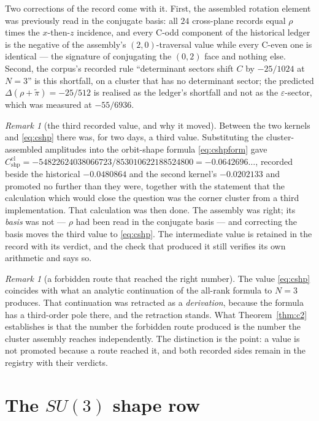 \documentclass[11pt]{article}
\theoremstyle{definition}
\theoremstyle{remark}
\newtheorem{remark}[theorem]{Remark}
\begin{document}
Two corrections of the record come with it. First, the assembled rotation
element was previously read in the conjugate basis: all $24$ cross-plane
records equal $\rho$ times the $x$-then-$z$ incidence, and every C-odd component
of the historical ledger is the negative of the assembly's $(2,0)$-traversal
value while every C-even one is identical --- the signature of conjugating the
$(0,2)$ face and nothing else. Second, the corpus's recorded rule
``determinant sectors shift $C$ by $-25/1024$ at $N=3$'' is this shortfall, on
a cluster that has no determinant sector; the predicted
$\Delta(\rho+\tilde\pi)=-25/512$ is realised as the ledger's shortfall and not
as the $\varepsilon$-sector, which was measured at $-55/6936$.

\begin{remark}[the third recorded value, and why it moved]
Between the two kernels and \eqref{eq:cshp} there was, for two days, a third
value. Substituting the cluster-assembled amplitudes into the orbit-shape
formula \eqref{eq:cshpform} gave
$C^{\mathrm{cl}}_{\mathrm{shp}}=-54822624038066723/853010622188524800
=-0.0642696\ldots$, recorded beside the historical $-0.0480864$ and the second
kernel's $-0.0202133$ and promoted no further than they were, together with the
statement that the calculation which would close the question was the corner
cluster from a third implementation. That calculation was then done. The
assembly was right; its \emph{basis} was not --- $\rho$ had been read in the
conjugate basis --- and correcting the basis moves the third value to
\eqref{eq:cshp}. The intermediate value is retained in the record with its
verdict, and the check that produced it still verifies its own arithmetic and
says so.
\end{remark}

\begin{remark}[a forbidden route that reached the right number]
The value \eqref{eq:cshp} coincides with what an analytic continuation of the
all-rank formula to $N=3$ produces. That continuation was retracted as a
\emph{derivation}, because the formula has a third-order pole there, and the
retraction stands. What Theorem~\ref{thm:c2} establishes is that the number the
forbidden route produced is the number the cluster assembly reaches
independently. The distinction is the point: a value is not promoted because a
route reached it, and both recorded sides remain in the registry with their
verdicts.
\end{remark}

\section{The $SU(3)$ shape row}\label{sec:su3}
\end{document}
